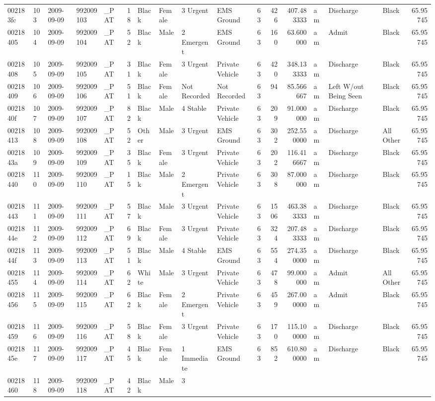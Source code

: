 \documentclass[]{elsarticle} %
\begin{document}
\begin{longtable}[]{@{}lllllrllllrrrlllr@{}}
002183fc & 103 & 2009-09-09 & 992009103 & \_PAT & 18 & Black & Female &
3 Urgent & EMS Ground & 63 & 426 & 407.483333 & am & Discharge & Black &
65.95745\tabularnewline
00218405 & 104 & 2009-09-09 & 992009104 & \_PAT & 52 & Black & Male & 2
Emergent & EMS Ground & 63 & 160 & 63.600000 & am & Admit & Black &
65.95745\tabularnewline
00218408 & 105 & 2009-09-09 & 992009105 & \_PAT & 31 & Black & Female &
3 Urgent & Private Vehicle & 63 & 420 & 348.133333 & am & Discharge &
Black & 65.95745\tabularnewline
00218409 & 106 & 2009-09-09 & 992009106 & \_PAT & 51 & Black & Female &
Not Recorded & Not Recorded & 63 & 94 & 85.566667 & am & Left W/out
Being Seen & Black & 65.95745\tabularnewline
0021840f & 107 & 2009-09-09 & 992009107 & \_PAT & 82 & Black & Male & 4
Stable & Private Vehicle & 63 & 209 & 91.000000 & am & Discharge & Black
& 65.95745\tabularnewline
00218413 & 108 & 2009-09-09 & 992009108 & \_PAT & 52 & Other & Male & 3
Urgent & EMS Ground & 63 & 302 & 252.550000 & am & Discharge & All Other
& 65.95745\tabularnewline
0021843a & 109 & 2009-09-09 & 992009109 & \_PAT & 35 & Black & Female &
3 Urgent & Private Vehicle & 63 & 202 & 116.416667 & am & Discharge &
Black & 65.95745\tabularnewline
00218440 & 110 & 2009-09-09 & 992009110 & \_PAT & 15 & Black & Male & 2
Emergent & Private Vehicle & 63 & 308 & 87.000000 & am & Discharge &
Black & 65.95745\tabularnewline
00218443 & 111 & 2009-09-09 & 992009111 & \_PAT & 57 & Black & Male & 3
Urgent & Private Vehicle & 63 & 1506 & 463.383333 & am & Discharge &
Black & 65.95745\tabularnewline
0021844e & 112 & 2009-09-09 & 992009112 & \_PAT & 69 & Black & Female &
3 Urgent & Private Vehicle & 63 & 324 & 207.483333 & am & Discharge &
Black & 65.95745\tabularnewline
0021844f & 113 & 2009-09-09 & 992009113 & \_PAT & 51 & Black & Male & 4
Stable & EMS Ground & 63 & 554 & 274.350000 & am & Discharge & Black &
65.95745\tabularnewline
00218455 & 114 & 2009-09-09 & 992009114 & \_PAT & 62 & White & Male & 3
Urgent & Private Vehicle & 63 & 478 & 99.000000 & am & Admit & All Other
& 65.95745\tabularnewline
00218456 & 115 & 2009-09-09 & 992009115 & \_PAT & 62 & Black & Female &
2 Emergent & Private Vehicle & 63 & 459 & 267.000000 & am & Admit &
Black & 65.95745\tabularnewline
00218459 & 116 & 2009-09-09 & 992009116 & \_PAT & 58 & Black & Female &
3 Urgent & Private Vehicle & 63 & 170 & 115.100000 & am & Discharge &
Black & 65.95745\tabularnewline
0021845e & 117 & 2009-09-09 & 992009117 & \_PAT & 45 & Black & Female &
1 Immediate & EMS Ground & 63 & 852 & 610.800000 & am & Discharge &
Black & 65.95745\tabularnewline
00218460 & 118 & 2009-09-09 & 992009118 & \_PAT & 42 & Black & Male & 3

\end{longtable}
\end{document}
